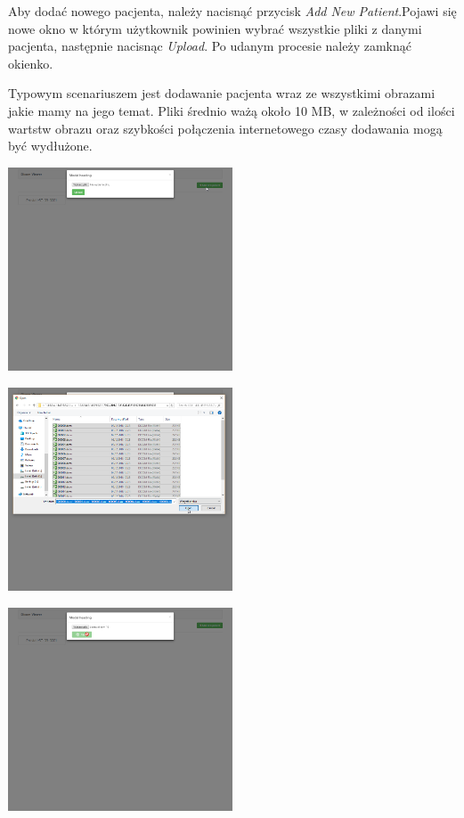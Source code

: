 \documentclass[a4paper,11pt,twoside]{report}
\theoremstyle{definition}
\begin{document}
Aby dodać nowego pacjenta, należy nacisnąć przycisk \textit{Add New Patient}.Pojawi się nowe okno w którym użytkownik powinien wybrać wszystkie pliki z danymi pacjenta, następnie nacisnąc \textit{Upload}. Po udanym procesie należy zamknąć okienko.
\par
Typowym scenariuszem jest dodawanie pacjenta wraz ze wszystkimi obrazami jakie mamy na jego temat. Pliki średnio ważą około 10 MB, w zależności od ilości wartstw obrazu oraz szybkości połączenia internetowego czasy dodawania mogą być wydłużone.
\begin{minipage}{\linewidth}
	\centering
	\includegraphics[width=0.5\textwidth]{FrontScreen/Main/15.png}
\end{minipage}
\begin{minipage}{\linewidth}
	\centering
	\includegraphics[width=0.5\textwidth]{FrontScreen/Main/95.png}
\end{minipage}
\begin{minipage}{\linewidth}
	\centering
	\includegraphics[width=0.5\textwidth]{FrontScreen/Main/114.png}
\end{minipage}
\end{document}

